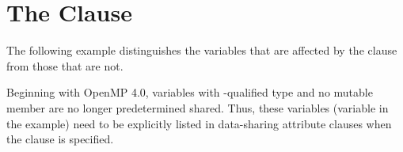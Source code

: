 \pagebreak
\section{The  Clause}
\label{sec:default_none}

The following example distinguishes the variables that are affected by the  
clause from those that are not. 

\ccppspecificstart
Beginning with OpenMP 4.0, variables with -qualified type and no mutable member 
are no longer predetermined shared.  Thus, these variables (variable  in the example) 
need to be explicitly listed
in data-sharing attribute clauses when the  clause is specified.

\ccppspecificend



